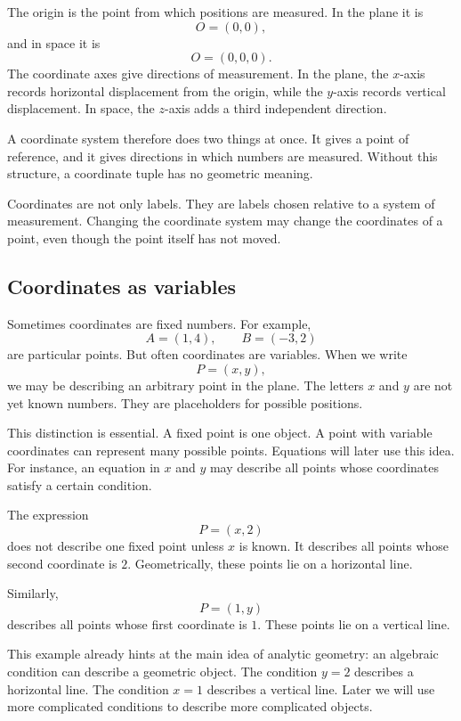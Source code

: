 The origin is the point from which positions are measured. In the plane it is
\[
O=(0,0),
\]
and in space it is
\[
O=(0,0,0).
\]
The coordinate axes give directions of measurement. In the plane, the \(x\)-axis records horizontal displacement from the origin, while the \(y\)-axis records vertical displacement. In space, the \(z\)-axis adds a third independent direction.

A coordinate system therefore does two things at once. It gives a point of reference, and it gives directions in which numbers are measured. Without this structure, a coordinate tuple has no geometric meaning.

\begin{remarkbox}
Coordinates are not only labels. They are labels chosen relative to a system of measurement. Changing the coordinate system may change the coordinates of a point, even though the point itself has not moved.
\end{remarkbox}

\subsection*{Coordinates as variables}

Sometimes coordinates are fixed numbers. For example,
\[
A=(1,4), \qquad B=(-3,2)
\]
are particular points. But often coordinates are variables. When we write
\[
P=(x,y),
\]
we may be describing an arbitrary point in the plane. The letters \(x\) and \(y\) are not yet known numbers. They are placeholders for possible positions.

This distinction is essential. A fixed point is one object. A point with variable coordinates can represent many possible points. Equations will later use this idea. For instance, an equation in \(x\) and \(y\) may describe all points whose coordinates satisfy a certain condition.

\begin{examplebox}
The expression
\[
P=(x,2)
\]
does not describe one fixed point unless \(x\) is known. It describes all points whose second coordinate is \(2\). Geometrically, these points lie on a horizontal line.

Similarly,
\[
P=(1,y)
\]
describes all points whose first coordinate is \(1\). These points lie on a vertical line.
\end{examplebox}

This example already hints at the main idea of analytic geometry: an algebraic condition can describe a geometric object. The condition \(y=2\) describes a horizontal line. The condition \(x=1\) describes a vertical line. Later we will use more complicated conditions to describe more complicated objects.

